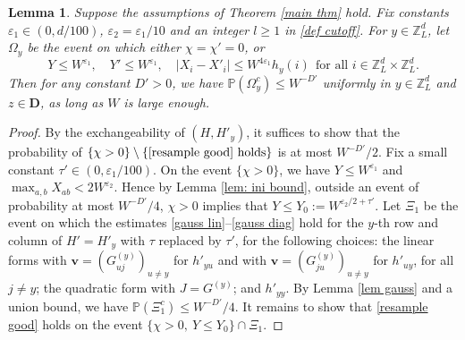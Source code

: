 \documentclass{article}
\newcommand{\1}{\mathds{1}}
\numberwithin{equation}{section}
\newcommand{\be}{\begin{equation}}
\newcommand{\ee}{\end{equation}}
\newcommand{\e}{{\varepsilon}}
\renewcommand{\leq}{\leqslant}
\renewcommand{\geq}{\geqslant}
\renewcommand{\le}{\leq}
\renewcommand{\ge}{\geq}
\renewcommand{\P}{\mathbb{P}}
\newcommand{\Z}{\mathbb{Z}}
\theoremstyle{plain} %
\newtheorem{lemma}[theorem]{Lemma}
\theoremstyle{remark}
\begin{document}
\begin{lemma}\label{lem resample}
Suppose the assumptions of Theorem \ref{main thm} hold. Fix constants $\e_1\in(0,d/100)$, $\e_2=\e_1/10$ and an integer $l\ge 1$ in \eqref{def cutoff}. For $y\in\Z_L^d$, let $\Omega_y$ be the event on which either $\chi=\chi'=0$, or
\be\label{resample good}
Y\le W^{\e_1},\quad Y'\le W^{\e_1},\quad |X_{i}-X'_{i}|\le W^{4\e_1}h_y(i)\ \ \text{for all } i\in \Z_L^d\times\Z_L^d.
\ee
Then for any constant $D'>0$, we have $\P(\Omega_y^c)\le W^{-D'}$ uniformly in $y\in \Z_L^d$ and $z\in \mathbf D$, as long as $W$ is large enough.
\end{lemma}
\begin{proof}
By the exchangeability of $(H,H'_y)$, it suffices to show that the probability of $\{\chi>0\}\setminus\{\eqref{resample good}\text{ holds}\}$ is at most $W^{-D'}/2$. Fix a small constant $\tau'\in (0,\e_1/100)$. On the event $\{\chi>0\}$, we have $Y\le W^{\e_1}$ and $\max_{a,b}X_{ab}< 2W^{\e_2}$. Hence by Lemma \ref{lem: ini bound}, outside an event of probability at most $W^{-D'}/4$, $\chi>0$ implies that $Y\le Y_0:=W^{\e_2/2+\tau'}$. Let $\Xi_1$ be the event on which the estimates \eqref{gauss lin}--\eqref{gauss diag} hold for the $y$-th row and column of $H'=H'_y$ with $\tau$ replaced by $\tau'$, for the following choices: the linear forms with $\mathbf v=(G^{(y)}_{uj})_{u\ne y}$ for $h'_{yu}$ and with $\mathbf v=(G^{(y)}_{ju})_{u\ne y}$ for $h'_{uy}$, for all $j\ne y$; the quadratic form with $J=G^{(y)}$; and $h'_{yy}$. By Lemma \ref{lem gauss} and a union bound, we have $\P(\Xi_1^c)\le W^{-D'}/4$. It remains to show that \eqref{resample good} holds on the event $\{\chi>0,\ Y\le Y_0\}\cap\Xi_1$.


\end{proof}
\end{document}
